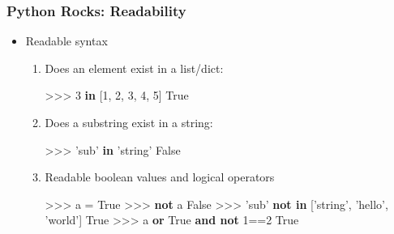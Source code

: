 \documentclass[t,10pt,compress=false,usepdftitle=false]{beamer}
\begin{document}
\begin{frame}[fragile]
    \frametitle{Python Rocks: Readability}
    \begin{itemize}
        \item Readable syntax
        \pause
        \begin{enumerate}
            \item Does an element exist in a list/dict:
            \begin{myColorBox}{0.8}{}
\begin{semiverbatim}
>>> 3 \textbf{in} [1, 2, 3, 4, 5]
True
\end{semiverbatim}
            \end{myColorBox}
            \pause
            \item Does a substring exist in a string:
            \begin{myColorBox}{0.8}{}
\begin{semiverbatim}
>>> 'sub' \textbf{in} 'string'
False
\end{semiverbatim}
                \end{myColorBox}
            \pause
            \item Readable boolean values and logical operators
            \begin{myColorBox}{0.8}{}
\begin{semiverbatim}
>>> a = True
>>> \textbf{not} a
False
>>> 'sub' \textbf{not in} ['string', 'hello', 'world']
True
>>> a \textbf{or} True \textbf{and not} 1==2
True
\end{semiverbatim}
            \end{myColorBox}
        \end{enumerate}
    \end{itemize}
\end{frame}
\end{document}
